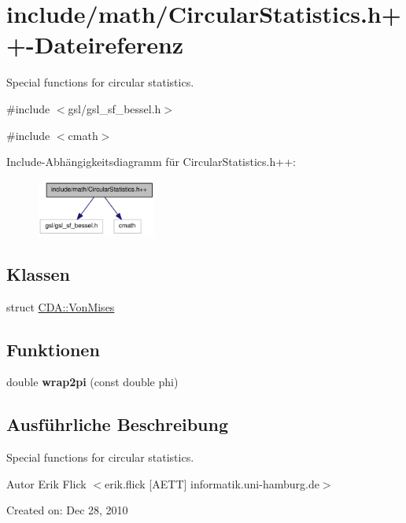 \hypertarget{CircularStatistics_8h_09_09}{
\section{include/math/CircularStatistics.h++-\/Dateireferenz}
\label{CircularStatistics_8h_09_09}
}


Special functions for circular statistics.  


{\ttfamily \#include $<$gsl/gsl\_\-sf\_\-bessel.h$>$}\par
{\ttfamily \#include $<$cmath$>$}\par
Include-\/Abhängigkeitsdiagramm für CircularStatistics.h++:\nopagebreak
\begin{figure}[H]
\begin{center}
\leavevmode
\includegraphics[width=111pt]{CircularStatistics_8h_09_09__incl}
\end{center}
\end{figure}
\subsection*{Klassen}
\begin{DoxyCompactItemize}
\item 
struct \hyperlink{structCDA_1_1VonMises}{CDA::VonMises}
\end{DoxyCompactItemize}
\subsection*{Funktionen}
\begin{DoxyCompactItemize}
\item 
\hypertarget{CircularStatistics_8h_09_09_a53bb96d37a7af4fd27ce73a33a69c63a}{
double {\bfseries wrap2pi} (const double phi)}
\label{CircularStatistics_8h_09_09_a53bb96d37a7af4fd27ce73a33a69c63a}

\end{DoxyCompactItemize}


\subsection{Ausführliche Beschreibung}
Special functions for circular statistics. \begin{DoxyAuthor}{Autor}
Erik Flick $<$erik.flick \mbox{[}AETT\mbox{]} informatik.uni-\/hamburg.de$>$
\end{DoxyAuthor}
Created on: Dec 28, 2010 